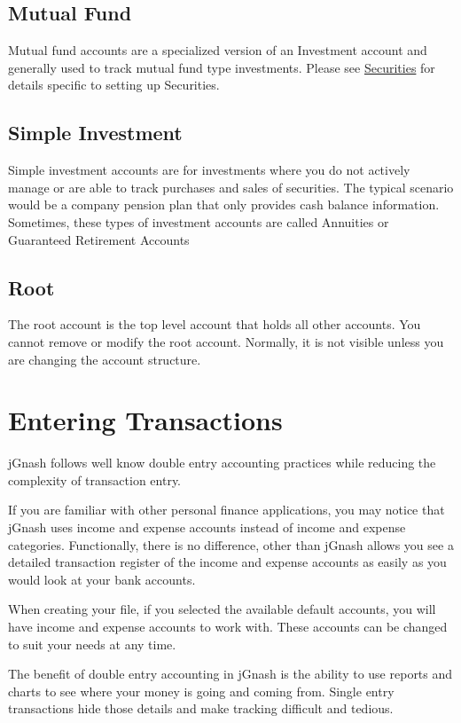 \documentclass[letterpaper,12pt]{book}
\begin{document}
    \subsection{Mutual Fund}
    Mutual fund accounts are a specialized version of an Investment account and generally used to track mutual fund type
    investments.
    Please see \hyperref[ch:securities]{Securities} for details specific to setting up Securities.

    \subsection{Simple Investment}
    Simple investment accounts are for investments where you do not actively manage or are able to track purchases and
    sales of securities.
    The typical scenario would be a company pension plan that only provides cash balance information.
    Sometimes, these types of investment accounts are called Annuities or Guaranteed Retirement Accounts

    \subsection{Root}
    The root account is the top level account that holds all other accounts.
    You cannot remove or modify the root account.
    Normally, it is not visible unless you are changing the account structure.

    \section{Entering Transactions}
    jGnash follows well know double entry accounting practices while reducing the complexity of transaction entry.

    If you are familiar with other personal finance applications, you may notice that jGnash uses income
    and expense accounts instead of income and expense categories. Functionally, there is no difference,
    other than jGnash allows you see a detailed transaction register of the income and expense accounts as
    easily as you would look at your bank accounts.

    When creating your file, if you selected the available default accounts, you will have income and expense
    accounts to work with.
    These accounts can be changed to suit your needs at any time.

    The benefit of double entry accounting in jGnash is the ability to use reports and charts to see where your
    money is going and coming from.
    Single entry transactions hide those details and make tracking difficult and tedious.
\end{document}
